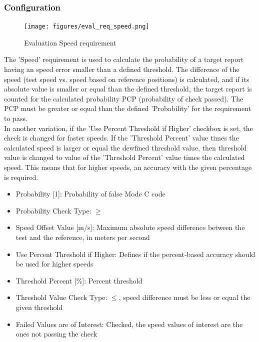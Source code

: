 \subsubsection{Configuration}

\begin{figure}[H]
    \texttt{[image: figures/eval\_req\_speed.png]}
  \caption{Evaluation Speed requirement}
\end{figure}

The 'Speed' requirement is used to calculate the probability of a target report having an speed error smaller than a defined threshold. The difference of the speed (test speed vs. speed based on reference positions) is calculated, and if its absolute value is smaller or equal than the defined threshold, the target report is counted for the calculated probability PCP (probability of check passed). The PCP must be greater or equal than the defined 'Probability' for the requirement to pass. \\

In another variation, if the 'Use Percent Threshold if Higher' checkbox is set, the check is changed for faster speeds. If the 'Threshold Percent' value times the calculated speed is larger or equal the dewfined threshold value, then threshold value is changed to value of the 'Threshold Percent' value times the calculated speed. This means that for higher speeds, an accuracy with the given percentage is required. \\

\begin{itemize}  
\item Probability [1]: Probability of false Mode C code
\item Probability Check Type: $\geq$
\item Speed Offset Value [m/s]: Maximum absolute speed difference between the test and the reference, in meters per second
\item Use Percent Threshold if Higher: Defines if the percent-based accuracy should be used for higher speeds
\item Threshold Percent [\%]: Percent threshold
\item Threshold Value Check Type: $\leq$, speed difference must be less or equal the given threshold
\item Failed Values are of Interest: Checked, the speed values of interest are the ones not passing the check
\end{itemize}
\ \\

